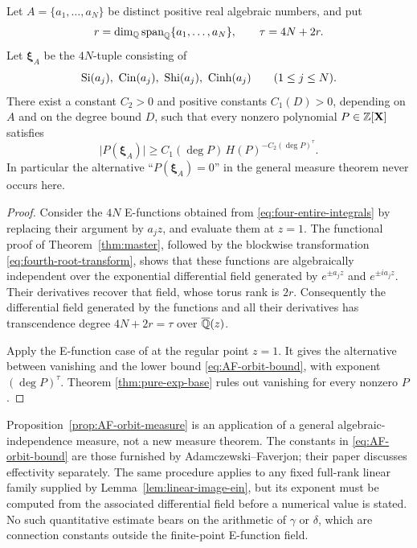 \begin{proposition}\label{prop:AF-orbit-measure}
Let \(A=\{a_1,\ldots,a_N\}\) be distinct positive real algebraic numbers,
and put
\[
 r=\dim_{\mathbb Q}\operatorname{span}_{\mathbb Q}\{a_1,\ldots,a_N\},\qquad
 \tau=4N+2r.
\]
Let \(\boldsymbol\xi_A\) be the \(4N\)-tuple consisting of
\[
 \Si(a_j),\ \Cin(a_j),\ \Shi(a_j),\ \Cinh(a_j)
 \qquad(1\le j\le N).
\]
There exist a constant \(C_2>0\) and positive constants \(C_1(D)>0\),
depending on \(A\) and on the degree bound \(D\), such that every nonzero
polynomial \(P\in\mathbb Z[\mathbf X]\) satisfies
\begin{equation}\label{eq:AF-orbit-bound}
 \bigl|P(\boldsymbol\xi_A)\bigr|
 \ge C_1(\deg P)\,
       H(P)^{-C_2(\deg P)^{\tau}}.
\end{equation}
In particular the alternative ``\(P(\boldsymbol\xi_A)=0\)'' in the general
measure theorem never occurs here.
\end{proposition}

\begin{proof}
Consider the \(4N\) E-functions obtained from
\eqref{eq:four-entire-integrals} by replacing their argument by \(a_jz\),
and evaluate them at \(z=1\).  The functional proof of
Theorem~\ref{thm:master}, followed by the blockwise transformation
\eqref{eq:fourth-root-transform}, shows that these functions are
algebraically independent over the exponential differential field generated
by \(e^{\pm a_jz}\) and \(e^{\pm ia_jz}\).  Their derivatives recover that
field, whose torus rank is \(2r\).  Consequently the differential field
generated by the functions and all their derivatives has transcendence
degree \(4N+2r=\tau\) over \(\overline{\mathbb Q}(z)\).

Apply the E-function case of
\cite[Theorem~1.3]{AdamczewskiFaverjon2025} at the regular point \(z=1\).
It gives the alternative between vanishing and the lower bound
\eqref{eq:AF-orbit-bound}, with exponent \((\deg P)^\tau\).  Theorem
\ref{thm:pure-exp-base} rules out vanishing for every nonzero \(P\).
\end{proof}

\begin{remark}
Proposition~\ref{prop:AF-orbit-measure} is an application of a general
algebraic-independence measure, not a new measure theorem.  The constants in
\eqref{eq:AF-orbit-bound} are those furnished by
Adamczewski--Faverjon; their paper discusses effectivity separately.  The
same procedure applies to any fixed full-rank linear family supplied by
Lemma~\ref{lem:linear-image-ein}, but its exponent must be computed from the
associated differential field before a numerical value is stated.  No such
quantitative estimate bears on the arithmetic of \(\gamma\) or \(\delta\),
which are connection constants outside the finite-point E-function field.
\end{remark}
